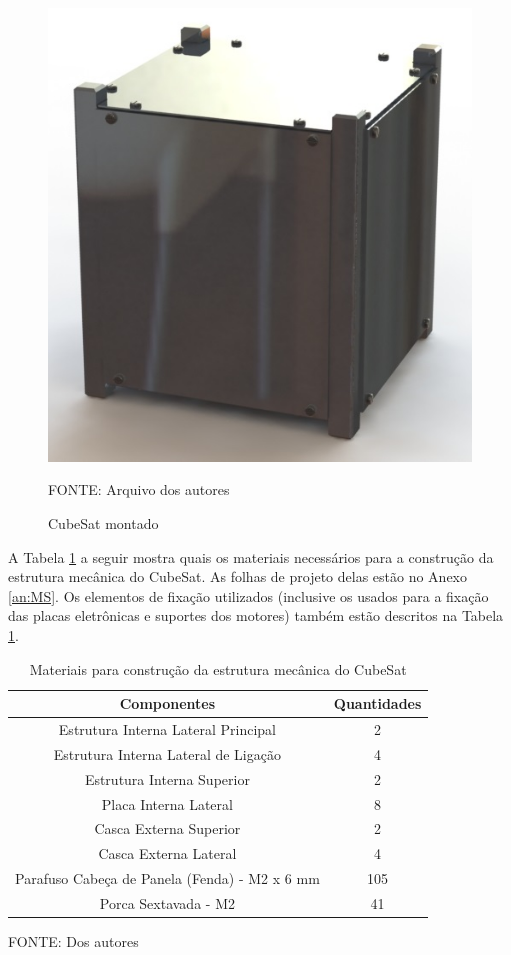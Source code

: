 \documentclass[
	12pt,				%
	openany,			%
	twoside,			%
	a4paper,			%
	english,			%
	french,				%
	spanish,			%
	brazil,				%
	oldfontcommands
	]{abntex2}
\begin{document}
\begin{figure}[th]
	\caption{CubeSat montado}
	\centering
	\includegraphics[width=0.7\linewidth]{./figs/Frame_Full}
	
	\begin{small}
		FONTE: Arquivo dos autores
	\end{small}
	\label{fig:FrameFull}
\end{figure}

\newpage

A Tabela \ref{tab:MatMec} a seguir mostra quais os materiais necessários para a construção da estrutura mecânica do CubeSat. As folhas de projeto delas estão no Anexo \ref{an:MS}. Os elementos de fixação utilizados (inclusive os usados para a fixação das placas eletrônicas e suportes dos motores) também estão descritos na Tabela \ref{tab:MatMec}.

\begin{table}[h]
	\caption{Materiais para construção da estrutura mecânica do CubeSat}
		\centering
	\begin{tabular}{|c|c|}
		\hline
		\textbf{Componentes} & \textbf{Quantidades} \\ 
		\hline 
		Estrutura Interna Lateral Principal & 2 \\ 
		\hline 
		Estrutura Interna Lateral de Ligação & 4 \\ 
		\hline 
		Estrutura Interna Superior & 2 \\
		\hline 
		Placa Interna Lateral & 8 \\
		\hline 
		Casca Externa Superior & 2 \\ 
		\hline 
		Casca Externa Lateral & 4 \\ 
		\hline 
		Parafuso Cabeça de Panela (Fenda) - M2 x 6 mm & 105 \\
		\hline
		Porca Sextavada - M2 & 41 \\
		\hline
	\end{tabular}
	
	\begin{small}
	\vspace{3pt}	
	FONTE: Dos autores
	\end{small}
	\label{tab:MatMec}
\end{table}
\end{document}
